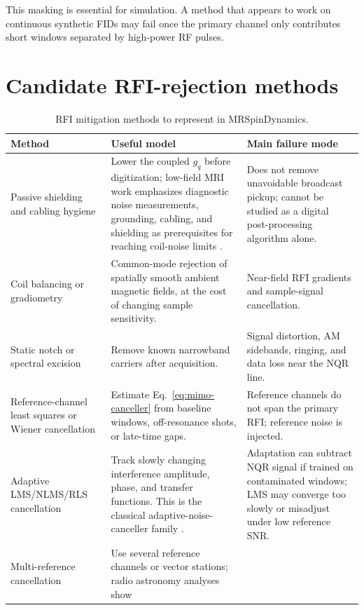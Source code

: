 \documentclass[10pt]{article}
\begin{document}
This masking is essential for simulation.  A method that appears to work on
continuous synthetic FIDs may fail once the primary channel only contributes
short windows separated by high-power RF pulses.

\section{Candidate RFI-rejection methods}

\begin{table}[h!]
\centering
\caption{RFI mitigation methods to represent in MRSpinDynamics.}
\label{tab:methods}
\footnotesize
\begin{tabularx}{\textwidth}{@{}>{\raggedright\arraybackslash}p{}>{\raggedright\arraybackslash}X>{\raggedright\arraybackslash}p{}@{}}
\toprule
\textbf{Method} & \textbf{Useful model} & \textbf{Main failure mode} \\
\midrule
Passive shielding and cabling hygiene &
Lower the coupled \(g_q\) before digitization; low-field MRI work emphasizes
diagnostic noise measurements, grounding, cabling, and shielding as prerequisites
for reaching coil-noise limits \cite{guallart2025}. &
Does not remove unavoidable broadcast pickup; cannot be studied as a digital
post-processing algorithm alone. \\
Coil balancing or gradiometry &
Common-mode rejection of spatially smooth ambient magnetic fields, at the cost
of changing sample sensitivity. &
Near-field RFI gradients and sample-signal cancellation. \\
Static notch or spectral excision &
Remove known narrowband carriers after acquisition. &
Signal distortion, AM sidebands, ringing, and data loss near the NQR line. \\
Reference-channel least squares or Wiener cancellation &
Estimate Eq.~\eqref{eq:mimo-canceller} from baseline windows, off-resonance shots,
or late-time gaps. &
Reference channels do not span the primary RFI; reference noise is injected. \\
Adaptive LMS/NLMS/RLS cancellation &
Track slowly changing interference amplitude, phase, and transfer functions.
This is the classical adaptive-noise-canceller family \cite{widrow1975,haykin2002}. &
Adaptation can subtract NQR signal if trained on contaminated windows; LMS may
converge too slowly or misadjust under low reference SNR. \\
Multi-reference cancellation &
Use several reference channels or vector stations; radio astronomy analyses show

\end{tabularx}
\end{table}
\end{document}
